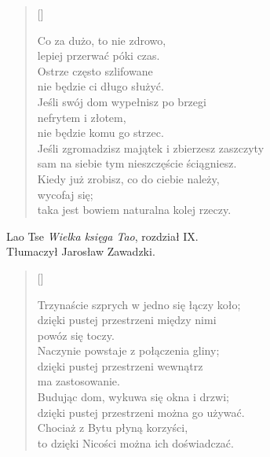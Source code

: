 \documentclass[a4paper,11pt]{article}
\newcommand{\attribB}[1]{#1}
\begin{document}
\begin{verse}[\versewidth]

  Co za dużo, to nie zdrowo, \\
  lepiej przerwać póki czas. \\
  Ostrze często szlifowane \\
  nie będzie ci długo służyć. \\
  Jeśli swój dom wypełnisz po brzegi \\
  nefrytem i złotem, \\
  nie będzie komu go strzec. \\
  Jeśli zgromadzisz majątek i zbierzesz zaszczyty \\
  sam na siebie tym nieszczęście ściągniesz. \\
  Kiedy już zrobisz, co do ciebie należy, \\
  wycofaj się; \\
  taka jest bowiem naturalna kolej rzeczy.

\end{verse}


\attribB{Lao Tse \emph{Wielka księga Tao}, rozdział IX. \\
  Tłumaczył Jarosław Zawadzki.}

\vspace{\spaceThree}



\settowidth{\versewidth}{Trzynaście szprych w jedno się łączy koło;}

\begin{verse}[\versewidth]

  Trzynaście szprych w jedno się łączy koło; \\
  dzięki pustej przestrzeni między nimi \\
  powóz się toczy. \\
  Naczynie powstaje z połączenia gliny; \\
  dzięki pustej przestrzeni wewnątrz \\
  ma zastosowanie. \\
  Budując dom, wykuwa się okna i drzwi; \\
  dzięki pustej przestrzeni można go używać. \\
  Chociaż z Bytu płyną korzyści, \\
  to dzięki Nicości można ich doświadczać.

\end{verse}
\end{document}
